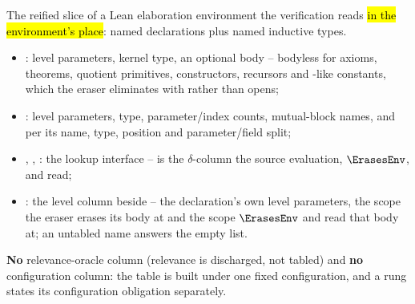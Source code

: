 \begin{definition}\label{def:Witness-SourceTable}
 \leanok
{} The reified slice of a Lean elaboration environment the verification reads \hl{in the
environment's place}: named declarations plus named inductive types.
\begin{itemize}
\item {}: level parameters, kernel type, an optional body -- bodyless for axioms,
theorems, quotient primitives, constructors, recursors and -like constants, which the
eraser eliminates with rather than opens;
\item {}: level parameters, type, parameter/index counts, mutual-block names, and
per  its name, type, position and parameter/field split;
\item {}, , : the lookup interface --  is the
$\delta$-column the source evaluation, $\ErasesEnv$,  and  read;
\item {}: the level column beside  -- the declaration's own level
parameters, the scope the eraser erases its body at and the scope $\ErasesEnv$ and
 read that body at; an untabled name answers the empty list.
\end{itemize}
 \textbf{No} relevance-oracle column (relevance is discharged, not tabled) and \textbf{no}
configuration column: the table is built under one fixed configuration, and a rung states its
configuration obligation separately.
\end{definition}

